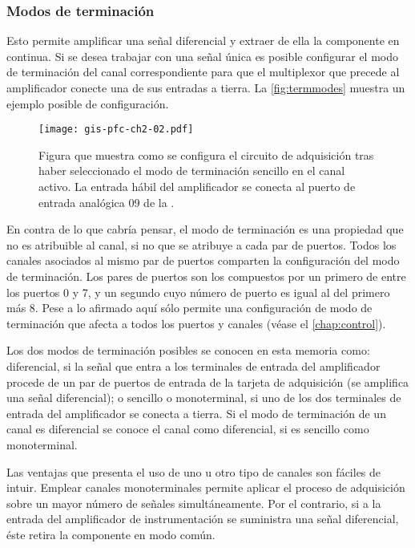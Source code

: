 \subsubsection{Modos de terminación}\label{subsubsec:termmodes}

Esto permite amplificar una señal diferencial y extraer de ella la
componente en continua. Si se desea trabajar con una señal única es posible
configurar el modo de terminación del canal correspondiente para que el
multiplexor que precede al amplificador conecte una de sus entradas a
tierra. La \vref{fig:termmodes} muestra un ejemplo posible de
configuración.

\begin{figure}
	\begin{center}
		\texttt{[image: gis-pfc-ch2-02.pdf]}
	\end{center}
	\caption[Ejemplo de configuración del modo de terminación]{Figura
	que muestra como se configura el circuito de adquisición tras haber
	seleccionado el modo de terminación sencillo en el canal activo. La
	entrada hábil del amplificador se conecta al puerto de entrada
	analógica 09 de la \kpci{}.}
	\label{fig:termmodes}
\end{figure}

En contra de lo que cabría pensar, el modo de terminación es una propiedad
que no es atribuible al canal, si no que se atribuye a cada par de puertos.
Todos los canales asociados al mismo par de puertos comparten la
configuración del modo de terminación. Los pares de puertos son los
compuestos por un primero de entre los puertos 0 y 7, y un segundo cuyo
número de puerto es igual al del primero más 8. Pese a lo afirmado aquí
\matlab{} sólo permite una configuración de modo de terminación que afecta
a todos los puertos y canales (véase el \vref{chap:control}).

Los dos modos de terminación posibles se conocen en esta memoria como:
diferencial, si la señal que entra a los terminales de entrada del
amplificador procede de un par de puertos de entrada de la tarjeta de
adquisición (se amplifica una señal diferencial); o sencillo o
monoterminal, si uno de los dos terminales de entrada del amplificador se
conecta a tierra. Si el modo de terminación de un canal es diferencial se
conoce el canal como diferencial, si es sencillo como monoterminal.

Las ventajas que presenta el uso de uno u otro tipo de canales son fáciles
de intuir. Emplear canales monoterminales permite aplicar el proceso de
adquisición sobre un mayor número de señales simultáneamente. Por el
contrario, si a la entrada del amplificador de instrumentación se
suministra una señal diferencial, éste retira la componente en modo común.



